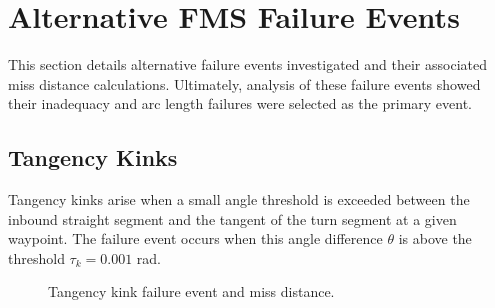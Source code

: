 \chapter{Alternative FMS Failure Events}\label{sec:application_events}
This section details alternative failure events investigated and their associated miss distance calculations.
Ultimately, analysis of these failure events showed their inadequacy and arc length failures were selected as the primary event.

\section{Tangency Kinks}
Tangency kinks arise when a small angle threshold is exceeded between the inbound straight segment and the tangent of the turn segment at a given waypoint. The failure event occurs when this angle difference $\theta$ is above the threshold $\tau_k = 0.001$ \si{\radian}.

\begin{figure}[!ht]
\centering
\resizebox{0.6\columnwidth}{!}{}
\caption{Tangency kink failure event and miss distance.}
\label{fig:tangency_kink}
\end{figure}

